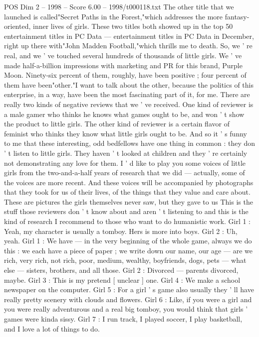 \begin{textsample}{POS Dim 2 – 1998 – Score 6.00 – 1998/t000118.txt}
The other title that we launched is called"Secret Paths in the Forest,"which addresses the more fantasy-oriented, inner lives of girls.
These two titles both showed up in the top 50 entertainment titles in PC Data — entertainment titles in PC Data in December, right up there with"John Madden Football,"which thrills me to death.
So, we ' re real, and we ' ve touched several hundreds of thousands of little girls.
We ' ve made half-a-billion impressions with marketing and PR for this brand, Purple Moon.
Ninety-six percent of them, roughly, have been positive ; four percent of them have been"other."I want to talk about the other, because the politics of this enterprise, in a way, have been the most fascinating part of it, for me.
There are really two kinds of negative reviews that we ' ve received.
One kind of reviewer is a male gamer who thinks he knows what games ought to be, and won ' t show the product to little girls.
The other kind of reviewer is a certain flavor of feminist who thinks they know what little girls ought to be.
And so it ' s funny to me that these interesting, odd bedfellows have one thing in common : they don ' t listen to little girls.
They haven ' t looked at children and they ' re certainly not demonstrating any love for them.
I ' d like to play you some voices of little girls from the two-and-a-half years of research that we did — actually, some of the voices are more recent.
And these voices will be accompanied by photographs that they took for us of their lives, of the things that they value and care about.
These are pictures the girls themselves never saw, but they gave to us This is the stuff those reviewers don ' t know about and aren ' t listening to and this is the kind of research I recommend to those who want to do humanistic work.
Girl 1 : Yeah, my character is usually a tomboy.
Hers is more into boys.
Girl 2 : Uh, yeah.
Girl 1 : We have — in the very beginning of the whole game, always we do this : we each have a piece of paper ; we write down our name, our age — are we rich, very rich, not rich, poor, medium, wealthy, boyfriends, dogs, pets — what else — sisters, brothers, and all those.
Girl 2 : Divorced — parents divorced, maybe.
Girl 3 : This is my pretend [ unclear ] one.
Girl 4 : We make a school newspaper on the computer.
Girl 5 : For a girl ' s game also usually they ' ll have really pretty scenery with clouds and flowers.
Girl 6 : Like, if you were a girl and you were really adventurous and a real big tomboy, you would think that girls ' games were kinda sissy.
Girl 7 : I run track, I played soccer, I play basketball, and I love a lot of things to do.

\end{textsample}
